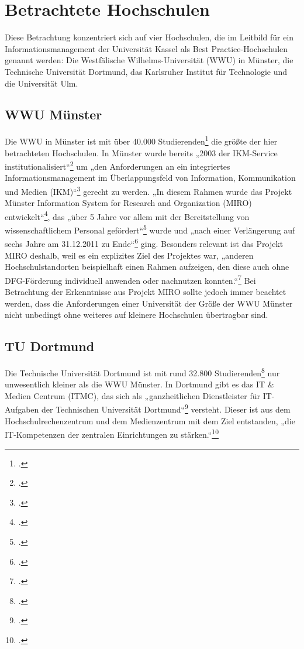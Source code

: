 \section{Betrachtete Hochschulen}
\label{section_betr_hochschule}
Diese Betrachtung konzentriert sich auf vier Hochschulen, die im Leitbild für ein Informationsmanagement der Universität Kassel als Best Practice-Hochschulen genannt werden: Die Westfälische Wilhelms-Universität (WWU) in Münster, die Technische Universität Dortmund, das  Karlsruher Institut für Technologie und die Universität Ulm.

\subsection{WWU Münster}
Die WWU in Münster ist mit über 40.000 Studierenden\footcite{wwu_profil_2015} die größte der hier betrachteten Hochschulen. In Münster wurde bereits „2003 der IKM-Service institutionalisiert“\footcite[47]{bode_informationsmanagement_2010} um „den Anforderungen an ein integriertes Informationsmanagement im Überlappungsfeld von Information, Kommunikation und Medien (IKM)“\footcite{bode_informationsmanagement_2010} gerecht zu werden. „In diesem Rahmen wurde das Projekt Münster Information System for Re\-search and Organization (MIRO) entwickelt“\footcite[47]{bode_informationsmanagement_2010}, das „über 5 Jahre vor allem mit der Bereitstellung von wissenschaftlichem Personal gefördert“\footcite[7]{vogl_bericht_2013} wurde und „nach einer Verlängerung auf sechs Jahre am 31.12.2011 zu Ende“\footcite[1]{vogl_bericht_2013} ging. Besonders relevant ist das Projekt MIRO deshalb, weil es ein explizites Ziel des Projektes war, „anderen Hochschulstandorten beispielhaft einen Rahmen aufzeigen, den diese auch ohne DFG-Förderung individuell anwenden oder nachnutzen konnten.“\footcite[1]{vogl_bericht_2013}
Bei Betrachtung der Erkenntnisse aus Projekt MIRO sollte jedoch immer beachtet werden, dass die Anforderungen einer Universität der Größe der WWU Münster nicht unbedingt ohne weiteres auf kleinere Hochschulen übertragbar sind.

\subsection{TU Dortmund}
Die Technische Universität Dortmund ist mit rund 32.800 Studierenden\footcite{tu_dortmund_profil_2015} nur unwesentlich kleiner als die WWU Münster. In Dortmund gibt es das IT \& Medien Centrum (ITMC), das sich als „ganzheitlichen Dienstleister für IT-Aufgaben der Technischen Universität Dortmund“\footcite{tu_dortmund_itmc_2015} versteht. Dieser ist aus dem Hochschulrechenzentrum und dem Medienzentrum mit dem Ziel entstanden, „die IT-Kompetenzen der zentralen Einrichtungen zu stärken.“\footcite{tu_dortmund_itmc_2015}

